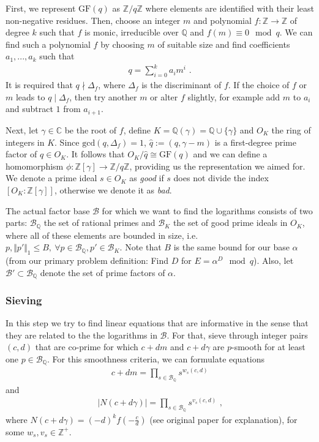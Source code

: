 \documentclass[paper=a4, fontsize=11pt]{scrartcl} %
\numberwithin{equation}{section} %
\numberwithin{figure}{section} %
\numberwithin{table}{section} %
\begin{document}
First, we represent $\mathrm{GF}(q)$ as $\mathbb{Z}/q\mathbb{Z}$ where elements are identified with their least non-negative residues. Then, choose an integer $m$ and polynomial $f:\mathbb{Z}\rightarrow\mathbb{Z}$ of degree $k$ such that $f$ is monic, irreducible over $\mathbb{Q}$ and $f(m)\equiv 0 \mod q$. We can find such a polynomial $f$ by choosing $m$ of suitable size and find coefficients $a_1,...,a_k$ such that
\begin{eqnarray}
q = \sum_{i=0}^{k}a_im^i
\text{ .}
\end{eqnarray}
It is required that $q\nmid\Delta_f$, where $\Delta_f$ is the discriminant of $f$. If the choice of $f$ or $m$ leads to $q\mid\Delta_f$, then try another $m$ or alter $f$ slightly, for example add $m$ to $a_i$ and subtract $1$ from $a_{i+1}$.

Next, let $\gamma\in\mathbb{C}$ be the root of $f$, define $K = \mathbb{Q}(\gamma) = \mathbb{Q}\cup\{\gamma\}$ and $O_K$ the ring of integers in $K$. Since $\mathrm{gcd}(q,\Delta_f) = 1$, $\hat{q}:=(q,\gamma-m)$ is a first-degree prime factor of $q\in O_K$. It follows that $O_K/\hat{q}\cong\mathrm{GF}(q)$ and we can define a homomorphism $\phi:\mathbb{Z}[\gamma]\rightarrow\mathbb{Z}/q\mathbb{Z}$, providing us the representation we aimed for. We denote a prime ideal $s\in O_K$ as \textit{good} if $s$ does not divide the index $[O_K:\mathbb{Z}[\gamma]]$, otherwise we denote it as \textit{bad}.

The actual factor base $\mathcal{B}$ for which we want to find the logarithms consists of two parts: $\mathcal{B}_\mathbb{Q}$ the set of rational primes and $\mathcal{B}_K$ the set of good prime ideals in $O_K$, where all of these elements are bounded in size, i.e. $p,\Vert p'\Vert_1\leq B,\ \forall p\in\mathcal{B}_\mathbb{Q},p'\in\mathcal{B}_K$. Note that $B$ is the same bound for our base $\alpha$ (from our primary problem definition: Find $D$ for $E=\alpha^D\mod q$). Also, let $\mathcal{B}'\subset\mathcal{B}_\mathbb{Q}$ denote the set of prime factors of $\alpha$.

\subsubsection{Sieving}
In this step we try to find linear equations that are informative in the sense that they are related to the the logarithms in $\mathcal{B}$. For that, sieve through integer pairs $(c,d)$ that are co-prime for which $c+dm$ and $c+d\gamma$ are $p$-smooth for at least one $p\in\mathcal{B}_\mathbb{Q}$. For this smoothness criteria, we can formulate equations
\begin{eqnarray}
c+dm = \prod_{s\in\mathcal{B}_\mathbb{Q}}s^{w_s(c,d)}
\end{eqnarray}
and
\begin{eqnarray}
|N(c+d\gamma)| = \prod_{s\in\mathcal{B}_\mathbb{Q}}s^{v_s(c,d)}
\text{ ,}
\end{eqnarray}
where $N(c+d\gamma) = (-d)^kf(-\frac{c}{d})$ (see original paper \citep{gordon1993discrete} for explanation), for some $w_s,v_s\in\mathbb{Z}^+$.
\end{document}

